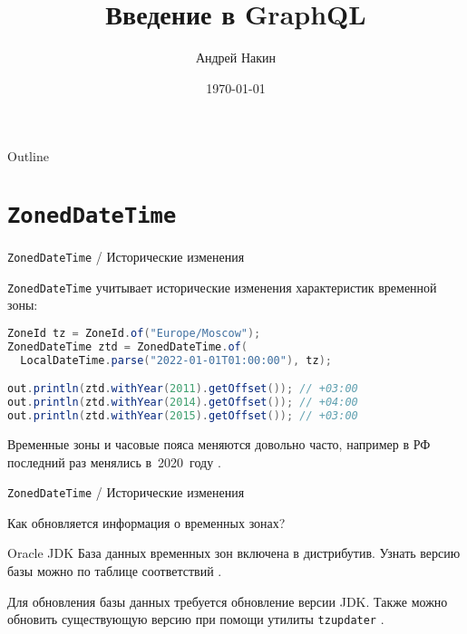 \documentclass{beamer}
\title{Введение в GraphQL}
\author{Андрей Накин}
\date{\today}
\begin{document}
\begin{frame}
    \titlepage 
\end{frame}



\begin{frame}{Outline}
    \tableofcontents
\end{frame}


\section{{\tt ZonedDateTime}}

\begin{frame}[fragile]{{\tt ZonedDateTime} / Исторические изменения}

{\tt ZonedDateTime} учитывает исторические изменения характеристик временной зоны:
\bigskip

\begin{lstlisting}[language=java]
ZoneId tz = ZoneId.of("Europe/Moscow");
ZonedDateTime ztd = ZonedDateTime.of(
  LocalDateTime.parse("2022-01-01T01:00:00"), tz);

out.println(ztd.withYear(2011).getOffset()); // +03:00
out.println(ztd.withYear(2014).getOffset()); // +04:00
out.println(ztd.withYear(2015).getOffset()); // +03:00
\end{lstlisting}

Временные зоны и часовые пояса меняются довольно часто, например в РФ последний раз менялись в~2020~году \cite{dst_news}.

\end{frame}

\begin{frame}[fragile]{{\tt ZonedDateTime} / Исторические изменения}

  Как обновляется информация о временных зонах?

  \begin{block}{Oracle JDK}
  	\bigskip База данных временных зон включена в дистрибутив. Узнать версию базы можно по таблице соответствий \cite{oracle_tzdata}. 
  	
  	Для обновления базы данных требуется обновление версии JDK. Также можно обновить существующую версию при помощи утилиты {\tt tzupdater} \cite{tzupdater}.
  \end{block}

\end{frame}

\end{document}
